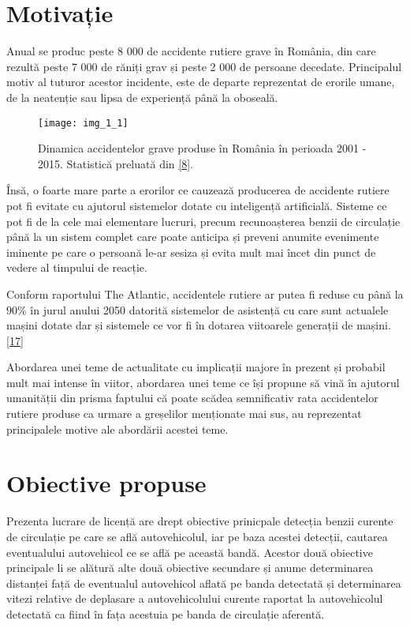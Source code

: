 \section{Motivație}

Anual se produc peste 8 000 de accidente rutiere grave în România, din care rezultă peste 7 000 de răniți grav și peste 2 000 de persoane decedate. Principalul motiv al tuturor acestor incidente, este de departe reprezentat de erorile umane, de la neatenție sau lipsa de experiență până la oboseală.
\begin{figure}[!h]
	\centering
	\texttt{[image: img\_1\_1]}
	\caption[Dinamica accidente rutiere]{Dinamica accidentelor grave produse în România în perioada 2001 - 2015. Statistică preluată din \hyperlink{Dinamicaaccidentelorrutiere}{[8]}.}
\end{figure} 

Însă, o foarte mare parte a erorilor ce cauzează producerea de accidente rutiere pot fi evitate cu ajutorul sistemelor dotate cu inteligență artificială. Sisteme ce pot fi de la cele mai elementare lucruri, precum recunoașterea benzii de circulație până la un sistem complet care poate anticipa și preveni anumite evenimente iminente pe care o persoană le-ar sesiza și evita mult mai încet din punct de vedere al timpului de reacție.

Conform raportului The Atlantic, accidentele rutiere ar putea fi reduse cu până la $90\%$ în jurul anului 2050 datorită sistemelor de asistență cu care sunt actualele mașini dotate dar și sistemele ce vor fi în dotarea viitoarele generații de mașini. \hyperlink{TheAtlantic}{[17]}

Abordarea unei teme de actualitate cu implicații majore în prezent și probabil mult mai intense în viitor, abordarea unei teme ce își propune să vină în ajutorul umanității din prisma faptului că poate scădea semnificativ rata accidentelor rutiere produse ca urmare a greșelilor menționate mai sus, au reprezentat principalele motive ale abordării acestei teme.

\section{Obiective propuse}

Prezenta lucrare de licență are drept obiective prinicpale detecția benzii curente de circulație pe care se află autovehicolul, iar pe baza acestei detecții, cautarea eventualului autovehicol ce se află pe această bandă. 
Acestor două obiective principale li se alătură alte două obiective secundare și anume determinarea distanței față de eventualul autovehicol aflată pe banda detectată și determinarea vitezi relative de deplasare a autovehicolului curente raportat la autovehicolul detectată ca fiind în fața acestuia pe banda de circulație aferentă.

